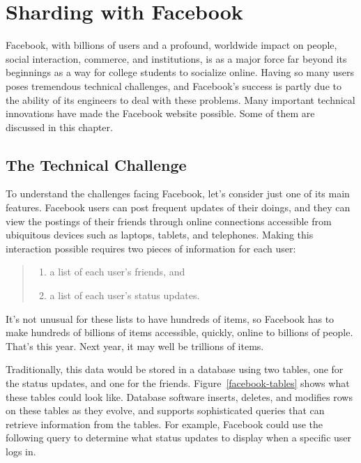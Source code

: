 \chapter{Sharding with Facebook}

Facebook,
with billions of users and a profound, worldwide impact
on people, social interaction, commerce, and institutions,
is as a major force far beyond its beginnings
as a way for college students to socialize online.
Having so many users poses tremendous technical challenges,
and Facebook's success is partly due to
the ability of its engineers to deal with these problems.
Many important technical innovations
have made the Facebook website possible.
Some of them are discussed in this chapter.

\section{The Technical Challenge}

To understand the challenges facing Facebook,
let's consider just one of its main features.
Facebook users can post frequent updates of their doings,
and they can view the postings of their friends through online connections
accessible from ubiquitous devices such as laptops, tablets, and telephones.
Making this interaction possible requires two pieces of information for each user:
\begin{quote}
\begin{enumerate}
	\item a list of each user's friends, and
	\item a list of each user's status updates.
\end{enumerate}
\end{quote}
It's not unusual for these lists to have hundreds of items,
so Facebook has to make hundreds of billions of items
accessible, quickly, online to billions of people.
That's this year. Next year, it may well be trillions of items.

Traditionally, this data would be stored in a database
using two tables, one for the status updates,
and one for the friends.  Figure~\ref{facebook-tables}
shows what these tables could look like.
Database software inserts, deletes, and modifies
rows on these tables as they evolve,
and supports sophisticated queries that can
retrieve information from the tables.
For example, Facebook could use the following query to determine
what status updates to display when a specific user logs in.

